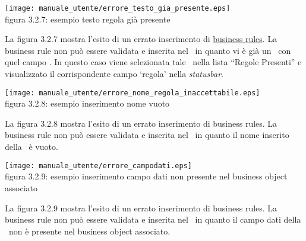\begin{center}
\texttt{[image: manuale\_utente/errore\_testo\_gia\_presente.eps]}\\
 figura 3.2.7: esempio testo regola gi\`a presente
\end{center} 
La figura 3.2.7 mostra l'esito di un errato inserimento di \underline{business rules}. La business rule non pu\`o essere validata e inserita nel \rp\ in quanto vi \`e gi\`a un \br\ con quel campo . In questo caso viene selezionata tale \br\ nella lista ``Regole Presenti'' e visualizzato il corrispondente campo `regola' nella \textit{statusbar}.

\begin{center}
\texttt{[image: manuale\_utente/errore\_nome\_regola\_inaccettabile.eps]}\\
 figura 3.2.8: esempio inserimento nome vuoto
\end{center} 
La figura 3.2.8 mostra l'esito di un errato inserimento di business rules. La business rule non pu\`o essere validata e inserita nel \rp\ in quanto il nome inserito  della \br\ \`e vuoto.

\begin{center}
\texttt{[image: manuale\_utente/errore\_campodati.eps]}\\
 figura 3.2.9: esempio inserimento campo dati non presente nel business object associato
\end{center} 
La figura 3.2.9 mostra l'esito di un errato inserimento di business rules. La business rule non pu\`o essere validata e inserita nel \rp\ in quanto il campo dati della \br\ non \`e presente nel business object associato.


